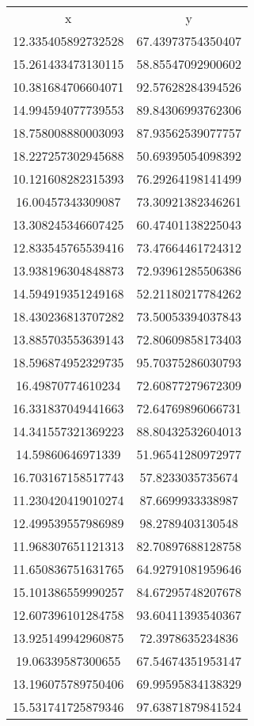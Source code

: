 \begin{table}
\begin{tabular}{cc}
x & y \\
12.335405892732528 & 67.43973754350407 \\
15.261433473130115 & 58.85547092900602 \\
10.381684706604071 & 92.57628284394526 \\
14.994594077739553 & 89.84306993762306 \\
18.758008880003093 & 87.93562539077757 \\
18.227257302945688 & 50.69395054098392 \\
10.121608282315393 & 76.29264198141499 \\
16.00457343309087 & 73.30921382346261 \\
13.308245346607425 & 60.47401138225043 \\
12.833545765539416 & 73.47664461724312 \\
13.938196304848873 & 72.93961285506386 \\
14.594919351249168 & 52.21180217784262 \\
18.430236813707282 & 73.50053394037843 \\
13.885703553639143 & 72.80609858173403 \\
18.596874952329735 & 95.70375286030793 \\
16.49870774610234 & 72.60877279672309 \\
16.331837049441663 & 72.64769896066731 \\
14.341557321369223 & 88.80432532604013 \\
14.59860646971339 & 51.96541280972977 \\
16.703167158517743 & 57.8233035735674 \\
11.230420419010274 & 87.6699933338987 \\
12.499539557986989 & 98.2789403130548 \\
11.968307651121313 & 82.70897688128758 \\
11.650836751631765 & 64.92791081959646 \\
15.101386559990257 & 84.67295748207678 \\
12.607396101284758 & 93.60411393540367 \\
13.925149942960875 & 72.3978635234836 \\
19.06339587300655 & 67.54674351953147 \\
13.196075789750406 & 69.99595834138329 \\
15.531741725879346 & 97.63871879841524 \\

\end{tabular}
\end{table}
